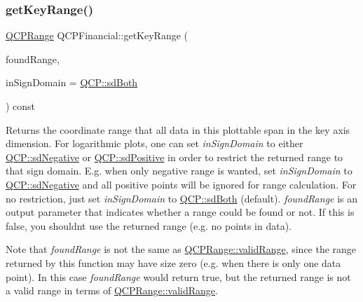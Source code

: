 \mbox{\label{class_q_c_p_financial_a15d68fb257113fef697356d65fa76559}} 
\subsubsection{\texorpdfstring{getKeyRange()}{getKeyRange()}}
{\footnotesize\ttfamily \mbox{\hyperlink{class_q_c_p_range}{Q\+C\+P\+Range}} Q\+C\+P\+Financial\+::get\+Key\+Range (\begin{DoxyParamCaption}\item[{bool \&}]{found\+Range,  }\item[{\mbox{\hyperlink{namespace_q_c_p_afd50e7cf431af385614987d8553ff8a9}{Q\+C\+P\+::\+Sign\+Domain}}}]{in\+Sign\+Domain = {\ttfamily \mbox{\hyperlink{namespace_q_c_p_afd50e7cf431af385614987d8553ff8a9aa38352ef02d51ddfa4399d9551566e24}{Q\+C\+P\+::sd\+Both}}} }\end{DoxyParamCaption}) const\hspace{0.3cm}{\ttfamily [virtual]}}

Returns the coordinate range that all data in this plottable span in the key axis dimension. For logarithmic plots, one can set {\itshape in\+Sign\+Domain} to either \mbox{\hyperlink{namespace_q_c_p_afd50e7cf431af385614987d8553ff8a9a2d18af0bc58f6528d1e82ce699fe4829}{Q\+C\+P\+::sd\+Negative}} or \mbox{\hyperlink{namespace_q_c_p_afd50e7cf431af385614987d8553ff8a9a584784b75fb816abcc627cf743bb699f}{Q\+C\+P\+::sd\+Positive}} in order to restrict the returned range to that sign domain. E.\+g. when only negative range is wanted, set {\itshape in\+Sign\+Domain} to \mbox{\hyperlink{namespace_q_c_p_afd50e7cf431af385614987d8553ff8a9a2d18af0bc58f6528d1e82ce699fe4829}{Q\+C\+P\+::sd\+Negative}} and all positive points will be ignored for range calculation. For no restriction, just set {\itshape in\+Sign\+Domain} to \mbox{\hyperlink{namespace_q_c_p_afd50e7cf431af385614987d8553ff8a9aa38352ef02d51ddfa4399d9551566e24}{Q\+C\+P\+::sd\+Both}} (default). {\itshape found\+Range} is an output parameter that indicates whether a range could be found or not. If this is false, you shouldn\textquotesingle{}t use the returned range (e.\+g. no points in data).

Note that {\itshape found\+Range} is not the same as \mbox{\hyperlink{class_q_c_p_range_ab38bd4841c77c7bb86c9eea0f142dcc0}{Q\+C\+P\+Range\+::valid\+Range}}, since the range returned by this function may have size zero (e.\+g. when there is only one data point). In this case {\itshape found\+Range} would return true, but the returned range is not a valid range in terms of \mbox{\hyperlink{class_q_c_p_range_ab38bd4841c77c7bb86c9eea0f142dcc0}{Q\+C\+P\+Range\+::valid\+Range}}.

